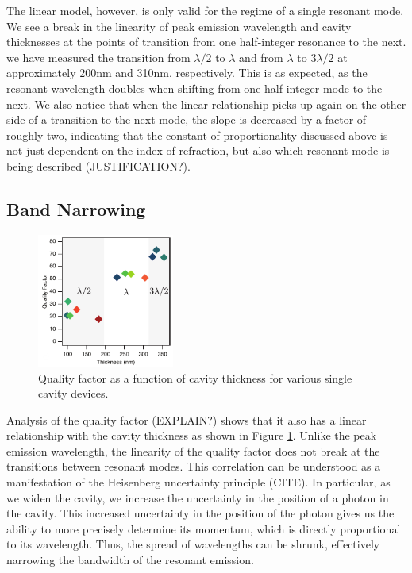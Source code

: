 \documentclass{report}
\begin{document}
            The linear model, however, is only valid for the regime of a single resonant mode. We see a break in the linearity of peak emission wavelength and cavity thicknesses at the points of transition from one half-integer resonance to the next. we have measured the transition from $\lambda/2$ to $\lambda$ and from $\lambda$ to $3\lambda/2$ at approximately 200nm and 310nm, respectively. This is as expected, as the resonant wavelength doubles when shifting from one half-integer mode to the next. We also notice that when the linear relationship picks up again on the other side of a transition to the next mode, the slope is decreased by a factor of roughly two, indicating that the constant of proportionality discussed above is not just dependent on the index of refraction, but also which resonant mode is being described (JUSTIFICATION?).
        
        \subsection{Band Narrowing} \label{bandwidth}
            \begin{figure}
                \centering
                \includegraphics[width=0.4\textwidth]{images/n1_quality_factor.png}
                \caption{\small Quality factor as a function of cavity thickness for various single cavity devices.}
                \label{fig:bandwidth}
            \end{figure}

            Analysis of the quality factor (EXPLAIN?) shows that it also has a linear relationship with the cavity thickness as shown in Figure \ref{fig:bandwidth}. Unlike the peak emission wavelength, the linearity of the quality factor does not break at the transitions between resonant modes. This correlation can be understood as a manifestation of the Heisenberg uncertainty principle (CITE). In particular, as we widen the cavity, we increase the uncertainty in the position of a photon in the cavity. This increased uncertainty in the position of the photon gives us the ability to more precisely determine its momentum, which is directly proportional to its wavelength. Thus, the spread of wavelengths can be shrunk, effectively narrowing the bandwidth of the resonant emission.
\end{document}
